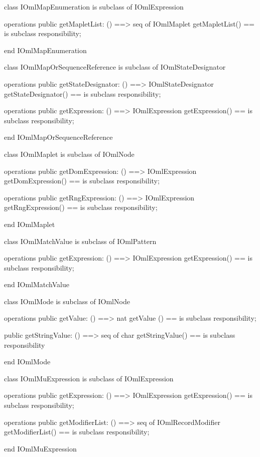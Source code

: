 \begin{vdm_al}
class IOmlMapEnumeration
 is subclass of IOmlExpression

operations
  public getMapletList: () ==> seq of IOmlMaplet
  getMapletList() == is subclass responsibility;

end IOmlMapEnumeration
\end{vdm_al}

\begin{vdm_al}
class IOmlMapOrSequenceReference
 is subclass of IOmlStateDesignator

operations
  public getStateDesignator: () ==> IOmlStateDesignator
  getStateDesignator() == is subclass responsibility;

operations
  public getExpression: () ==> IOmlExpression
  getExpression() == is subclass responsibility;

end IOmlMapOrSequenceReference
\end{vdm_al}

\begin{vdm_al}
class IOmlMaplet
 is subclass of IOmlNode

operations
  public getDomExpression: () ==> IOmlExpression
  getDomExpression() == is subclass responsibility;

operations
  public getRngExpression: () ==> IOmlExpression
  getRngExpression() == is subclass responsibility;

end IOmlMaplet
\end{vdm_al}

\begin{vdm_al}
class IOmlMatchValue
 is subclass of IOmlPattern

operations
  public getExpression: () ==> IOmlExpression
  getExpression() == is subclass responsibility;

end IOmlMatchValue
\end{vdm_al}

\begin{vdm_al}
class IOmlMode
 is subclass of IOmlNode

operations
  public getValue: () ==> nat
  getValue () == is subclass responsibility;

  public getStringValue: () ==> seq of char
  getStringValue() == is subclass responsibility

end IOmlMode
\end{vdm_al}

\begin{vdm_al}
class IOmlMuExpression
 is subclass of IOmlExpression

operations
  public getExpression: () ==> IOmlExpression
  getExpression() == is subclass responsibility;

operations
  public getModifierList: () ==> seq of IOmlRecordModifier
  getModifierList() == is subclass responsibility;

end IOmlMuExpression
\end{vdm_al}

